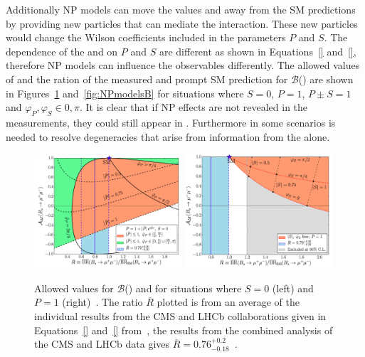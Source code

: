 Additionally NP models can move the \BF values and \ADG away from the SM predictions by providing new particles that can mediate the interaction. These new particles would change the Wilson coefficients included in the parameters $P$ and $S$. The dependence of the \BFs and \ADG on $P$ and $S$ are different as shown in Equations~\ref{} and~\ref{}, therefore NP models can influence the observables differently. The allowed values of \ADG and the ration of the measured and prompt SM prediction for $\mathcal{B}$(\bsmumu) are shown in Figures~\ref{fig:NPmodelsA} and~\ref{fig:NPmodelsB} for situations where $S=0$, $P=1$, $P\pm S = 1$ and $\varphi_P, \varphi_S \in {0, \pi}$. It is clear that if NP effects are not revealed in the \BF measurements, they could still appear in \ADG. Furthermore in some scenarios \ADG is needed to resolve degeneracies that arise from information from the \BF alone.
\begin{figure}[tbp]
    \centering
        \includegraphics[width=0.49\textwidth]{./Figs/Theory/NP_S_0.png}
        \includegraphics[width=0.49\textwidth]{./Figs/Theory/NP_P_1.png}
    \caption{Allowed values for $\mathcal{B}$(\bsmumu) and \ADG for situations where $S=0$ (left) and $P=1$ (right)~\cite{Buras:2013uqa,Knegjens:2014zva}. The ratio $\overline{R}$ plotted is from an average of the individual results from the CMS and LHCb collaborations given in Equations~\ref{} and~\ref{} from~\cite{CMSandLHCbCollaborations:2013pla}, the results from the combined analysis of the CMS and LHCb data gives $\overline{R} = 0.76^{+0.2}_{-0.18}$~\cite{CMS:2014xfa}.}
    \label{fig:NPmodelsA}
\end{figure}


